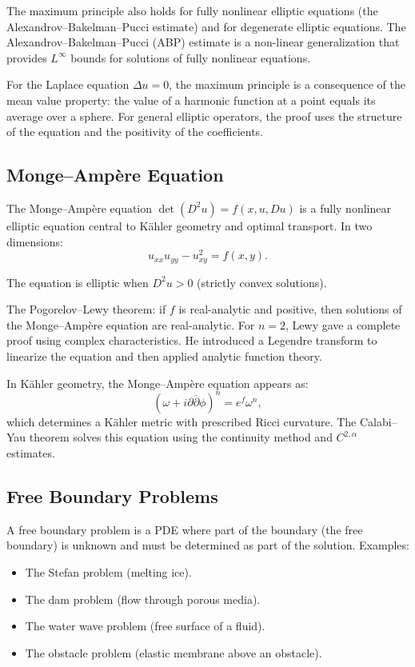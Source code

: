 The maximum principle also holds for fully nonlinear elliptic equations (the Alexandrov--Bakelman--Pucci estimate) and for degenerate elliptic equations. The Alexandrov--Bakelman--Pucci (ABP) estimate is a non-linear generalization that provides $L^\infty$ bounds for solutions of fully nonlinear equations.

For the Laplace equation $\Delta u = 0$, the maximum principle is a consequence of the mean value property: the value of a harmonic function at a point equals its average over a sphere. For general elliptic operators, the proof uses the structure of the equation and the positivity of the coefficients.

\subsection{Monge--Amp\`{e}re Equation}

The Monge--Amp\`{e}re equation $\det(D^2 u) = f(x, u, Du)$ is a fully nonlinear elliptic equation central to K\"{a}hler geometry and optimal transport. In two dimensions:
\[
u_{xx} u_{yy} - u_{xy}^2 = f(x, y).
\]

The equation is elliptic when $D^2 u > 0$ (strictly convex solutions).

The Pogorelov--Lewy theorem: if $f$ is real-analytic and positive, then solutions of the Monge--Amp\`{e}re equation are real-analytic. For $n=2$, Lewy gave a complete proof using complex characteristics. He introduced a Legendre transform to linearize the equation and then applied analytic function theory.

In K\"{a}hler geometry, the Monge--Amp\`{e}re equation appears as:
\[
(\omega + i \partial \overline{\partial} \phi)^n = e^f \omega^n,
\]
which determines a K\"{a}hler metric with prescribed Ricci curvature. The Calabi--Yau theorem solves this equation using the continuity method and $C^{2,\alpha}$ estimates.

\subsection{Free Boundary Problems}

A free boundary problem is a PDE where part of the boundary (the free boundary) is unknown and must be determined as part of the solution. Examples:
\begin{itemize}
    \item The Stefan problem (melting ice).
    \item The dam problem (flow through porous media).
    \item The water wave problem (free surface of a fluid).
    \item The obstacle problem (elastic membrane above an obstacle).
\end{itemize}

